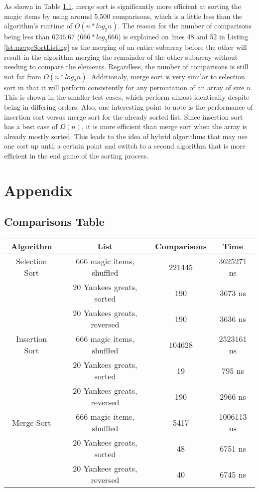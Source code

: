 \documentclass[letterpaper, 10pt,DIV=13]{scrartcl}
\numberwithin{equation}{section} %
\numberwithin{figure}{section} %
\numberwithin{table}{section} %
\begin{document}
As shown in Table \ref{comparisonsTable}, merge sort is significantly more efficient at sorting the magic items by using around 5,500 comparisons, which is a little less than the algorithm's runtime of $O(n * log_2n)$. The reason for the number of comparisons being less than 6246.67 ($666 * log_{2}666$) is explained on lines 48 and 52 in Listing \ref{lst:mergeSortListing} as the merging of an entire subarray before the other will result in the algorithm merging the remainder of the other subarray without needing to compare the elements. Regardless, the number of comparisons is still not far from $O(n * log_2n)$. Additionaly, merge sort is very similar to selection sort in that it will perform consistently for any permutation of an array of size $n$. This is shown in the smaller test cases, which perform almost identically despite being in differing orders. Also, one interesting point to note is the performance of insertion sort versus merge sort for the already sorted list. Since insertion sort has a best case of $\Omega(n)$, it is more efficient than merge sort when the array is already mostly sorted. This leads to the idea of hybrid algorithms that may use one sort up until a certain point and switch to a second algorithm that is more efficient in the end game of the sorting process.

\section{Appendix}
\subsection{Comparisons Table}\label{comparisonsTable}
\begin{center}
  \begin{tabular}{|c|c|c|c|}
    \hline
    Algorithm & List & Comparisons & Time \\
    \hline
    Selection Sort & 666 magic items, shuffled & 221445 & 3625271 ns \\
    \hline
    & 20 Yankees greats, sorted & 190 & 3673 ns \\
    \hline
    & 20 Yankees greats, reversed & 190 & 3636 ns \\
    \hline
    Insertion Sort & 666 magic items, shuffled & 104628 & 2523161 ns \\
    \hline
    & 20 Yankees greats, sorted & 19 & 795 ns \\
    \hline
    & 20 Yankees greats, reversed & 190 & 2966 ns \\
    \hline
    Merge Sort & 666 magic items, shuffled & 5417 & 1006113 ns \\
    \hline
    & 20 Yankees greats, sorted & 48 & 6751 ns \\
    \hline
    & 20 Yankees greats, reversed & 40 & 6745 ns \\
    \hline
  \end{tabular}
\end{center}
\end{document}
